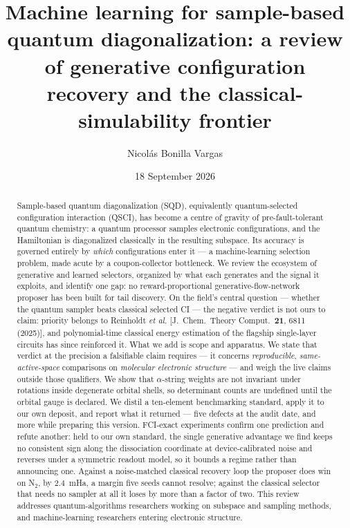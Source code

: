 \documentclass[onecolumn,a4paper]{quantumarticle}
\title{Machine learning for sample-based quantum diagonalization: a review of generative configuration recovery and the classical-simulability frontier}
\author{Nicol\'as Bonilla Vargas}
\affiliation{M.Sc.\ Physics, Universidad Nacional de Colombia; M.Sc.\ Applied Data Science \& AI, SRH University Heidelberg / Munich; Daita AI}
\date{18 September 2026}
\begin{document}
\maketitle
\begin{abstract}
Sample-based quantum diagonalization (SQD), equivalently quantum-selected configuration interaction (QSCI), has become a centre of gravity of pre-fault-tolerant quantum chemistry: a quantum processor samples electronic configurations, and the Hamiltonian is diagonalized classically in the resulting subspace. Its accuracy is governed entirely by \emph{which} configurations enter it --- a machine-learning selection problem, made acute by a coupon-collector bottleneck. We review the ecosystem of generative and learned selectors, organized by what each generates and the signal it exploits, and identify one gap: no reward-proportional generative-flow-network proposer has been built for tail discovery. On the field's central question --- whether the quantum sampler beats classical selected CI --- the negative verdict is not ours to claim: priority belongs to Reinholdt \emph{et al.} [J.\ Chem.\ Theory Comput.\ \textbf{21}, 6811 (2025)], and polynomial-time classical energy estimation of the flagship single-layer circuits has since reinforced it. What we add is scope and apparatus. We state that verdict at the precision a falsifiable claim requires --- it concerns \emph{reproducible}, \emph{same-active-space} comparisons on \emph{molecular electronic structure} --- and weigh the live claims outside those qualifiers. We show that $\alpha$-string weights are not invariant under rotations inside degenerate orbital shells, so determinant counts are undefined until the orbital gauge is declared. We distil a ten-element benchmarking standard, apply it to our own deposit, and report what it returned --- five defects at the audit date, and more while preparing this version. FCI-exact experiments confirm one prediction and refute another: held to our own standard, the single generative advantage we find keeps no consistent sign along the dissociation coordinate at device-calibrated noise and reverses under a symmetric readout model, so it bounds a regime rather than announcing one. Against a noise-matched classical recovery loop the proposer does win on N$_2$, by $2.4$~mHa, a margin five seeds cannot resolve; against the classical selector that needs no sampler at all it loses by more than a factor of two. This review addresses quantum-algorithms researchers working on subspace and sampling methods, and machine-learning researchers entering electronic structure.
\end{abstract}
\end{document}
